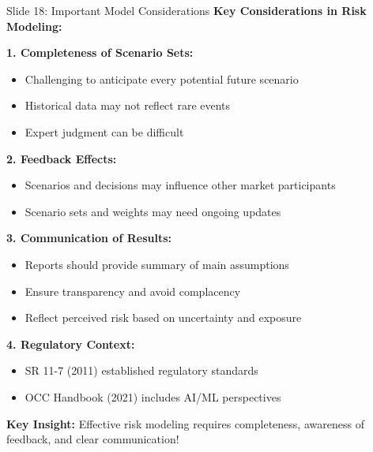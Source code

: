 \documentclass[8pt]{beamer}
\begin{document}
	\begin{frame}{Slide 18: Important Model Considerations}
		\fontsize{6.5}{7.5}\selectfont
		\textbf{Key Considerations in Risk Modeling:}
		
		\vspace{0.1cm}
		\textbf{1. Completeness of Scenario Sets:}
		\begin{itemize}
			\item Challenging to anticipate every potential future scenario
			\item Historical data may not reflect rare events
			\item Expert judgment can be difficult
		\end{itemize}
		
		\vspace{0.1cm}
		\textbf{2. Feedback Effects:}
		\begin{itemize}
			\item Scenarios and decisions may influence other market participants
			\item Scenario sets and weights may need ongoing updates
		\end{itemize}
		
		\vspace{0.1cm}
		\textbf{3. Communication of Results:}
		\begin{itemize}
			\item Reports should provide summary of main assumptions
			\item Ensure transparency and avoid complacency
			\item Reflect perceived risk based on uncertainty and exposure
		\end{itemize}
		
		\vspace{0.1cm}
		\textbf{4. Regulatory Context:}
		\begin{itemize}
			\item SR 11-7 (2011) established regulatory standards
			\item OCC Handbook (2021) includes AI/ML perspectives
		\end{itemize}
		
		\textcolor{myblue}{\textbf{Key Insight:}} Effective risk modeling requires \textcolor{myblue}{completeness, awareness of feedback, and clear communication}!
	\end{frame}
	
\end{document}

